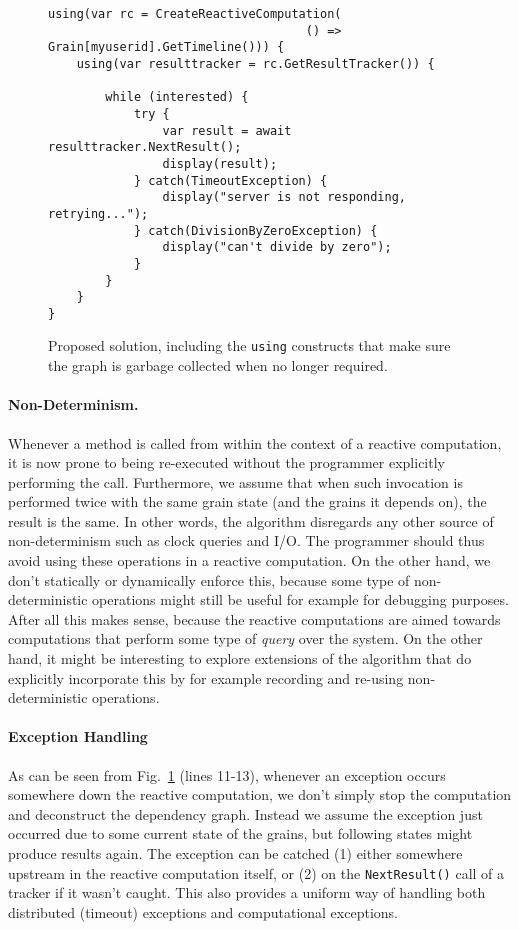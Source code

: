 \begin{figure}
\begin{lstlisting}
using(var rc = CreateReactiveComputation(
									() => Grain[myuserid].GetTimeline())) {
	using(var resulttracker = rc.GetResultTracker()) {

		while (interested) {
			try {
				var result = await resulttracker.NextResult();
				display(result);
			} catch(TimeoutException) { 
				display("server is not responding, retrying...");
			} catch(DivisionByZeroException) {
				display("can't divide by zero");			
			}
		}
	}
}
\end{lstlisting}
\caption{Proposed solution, including the \texttt{using} constructs that make sure the graph is garbage collected when no longer required.}\label{fig:impl}
\end{figure}

\paragraph{Non-Determinism.}
Whenever a method is called from within the context of a reactive computation, it is now prone to being re-executed without the programmer explicitly performing the call. Furthermore, we assume that when such invocation is performed twice with the same grain state (and the grains it depends on), the result is the same. In other words, the algorithm disregards any other source of non-determinism such as clock queries and I/O. The programmer should thus avoid using these operations in a reactive computation. On the other hand, we don't statically or dynamically enforce this, because some type of non-deterministic operations might still be useful for example for debugging purposes. After all this makes sense, because the reactive computations are aimed towards computations that perform some type of \textit{query} over the system. On the other hand, it might be interesting to explore extensions of the algorithm that do explicitly incorporate this by for example recording and re-using non-deterministic operations.

\paragraph{Exception Handling}
As can be seen from Fig.~\ref{fig:impl} (lines 11-13), whenever an exception occurs somewhere down the reactive computation, we don't simply stop the computation and deconstruct the dependency graph. Instead we assume the exception just occurred due to some current state of the grains, but following states might produce results again. The exception can be catched (1) either somewhere upstream in the reactive computation itself, or (2) on the \texttt{NextResult()} call of a tracker if it wasn't caught. This also provides a uniform way of handling both distributed (timeout) exceptions and computational exceptions. 


